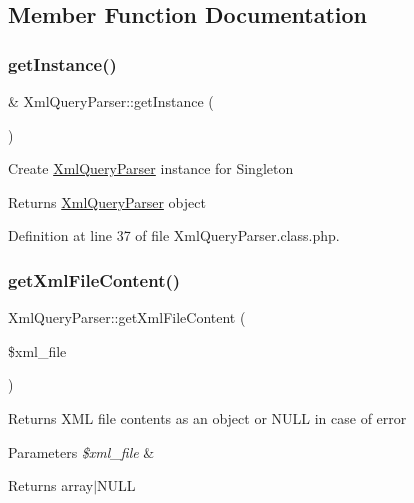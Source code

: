 \subsection{Member Function Documentation}
\mbox{\label{classXmlQueryParser_af6558a14a48242f4082d4b05e24b66be}} 
\subsubsection{\texorpdfstring{get\+Instance()}{getInstance()}}
{\footnotesize\ttfamily \& Xml\+Query\+Parser\+::get\+Instance (\begin{DoxyParamCaption}{ }\end{DoxyParamCaption})}

Create \hyperlink{classXmlQueryParser}{Xml\+Query\+Parser} instance for Singleton

\begin{DoxyReturn}{Returns}
\hyperlink{classXmlQueryParser}{Xml\+Query\+Parser} object 
\end{DoxyReturn}


Definition at line 37 of file Xml\+Query\+Parser.\+class.\+php.

\mbox{\label{classXmlQueryParser_aed43fc81b117c0d90948cb70cdad6280}} 
\subsubsection{\texorpdfstring{get\+Xml\+File\+Content()}{getXmlFileContent()}}
{\footnotesize\ttfamily Xml\+Query\+Parser\+::get\+Xml\+File\+Content (\begin{DoxyParamCaption}\item[{}]{\$xml\+\_\+file }\end{DoxyParamCaption})}

Returns X\+ML file contents as an object or N\+U\+LL in case of error


\begin{DoxyParams}{Parameters}
{\em \$xml\+\_\+file} & \\
\hline
\end{DoxyParams}
\begin{DoxyReturn}{Returns}
array$\vert$\+N\+U\+LL 
\end{DoxyReturn}


